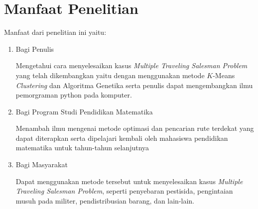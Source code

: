 \section{Manfaat Penelitian}

Manfaat dari penelitian ini yaitu:
\begin{enumerate}
	\item Bagi Penulis

	Mengetahui cara menyelesaikan kasus \textit{Multiple Traveling Salesman Problem} yang telah dikembangkan yaitu dengan menggunakan metode $K$-Means \textit{Clustering} dan Algoritma Genetika serta penulis dapat mengembangkan ilmu pemorgraman python pada komputer.

	\item Bagi Program Studi Pendidikan Matematika
	
	Menambah ilmu mengenai metode optimasi dan pencarian rute terdekat yang dapat diterapkan serta dipelajari kembali oleh mahasiswa pendidikan matematika untuk tahun-tahun selanjutnya
	
	\item Bagi Masyarakat
	
	Dapat menggunakan metode tersebut untuk menyelesaikan kasus \textit{Multiple Traveling Salesman Problem}, seperti penyebaran pestisida, pengintaian musuh pada militer, pendistribusian barang, dan lain-lain.
	
\end{enumerate}
